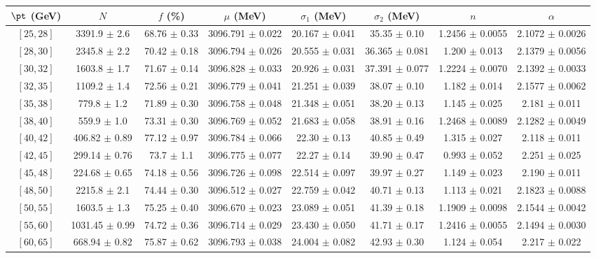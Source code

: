\begin{tabular}{c||c|c|c|c|c|c|c}
$\pt$ (GeV) & $N$ & $f$ (\%) & $\mu$ (MeV) & $\sigma_1$ (MeV) & $\sigma_2$ (MeV) & $n$ & $\alpha$ \\
\hline
$[25, 28]$ & 3391.9 $\pm$ 2.6 & 68.76 $\pm$ 0.33 & 3096.791 $\pm$ 0.022 & 20.167 $\pm$ 0.041 & 35.35 $\pm$ 0.10 & 1.2456 $\pm$ 0.0055 & 2.1072 $\pm$ 0.0026\\
$[28, 30]$ & 2345.8 $\pm$ 2.2 & 70.42 $\pm$ 0.18 & 3096.794 $\pm$ 0.026 & 20.555 $\pm$ 0.031 & 36.365 $\pm$ 0.081 & 1.200 $\pm$ 0.013 & 2.1379 $\pm$ 0.0056\\
$[30, 32]$ & 1603.8 $\pm$ 1.7 & 71.67 $\pm$ 0.14 & 3096.828 $\pm$ 0.033 & 20.926 $\pm$ 0.031 & 37.391 $\pm$ 0.077 & 1.2224 $\pm$ 0.0070 & 2.1392 $\pm$ 0.0033\\
$[32, 35]$ & 1109.2 $\pm$ 1.4 & 72.56 $\pm$ 0.21 & 3096.779 $\pm$ 0.041 & 21.251 $\pm$ 0.039 & 38.07 $\pm$ 0.10 & 1.182 $\pm$ 0.014 & 2.1577 $\pm$ 0.0062\\
$[35, 38]$ & 779.8 $\pm$ 1.2 & 71.89 $\pm$ 0.30 & 3096.758 $\pm$ 0.048 & 21.348 $\pm$ 0.051 & 38.20 $\pm$ 0.13 & 1.145 $\pm$ 0.025 & 2.181 $\pm$ 0.011\\
$[38, 40]$ & 559.9 $\pm$ 1.0 & 73.31 $\pm$ 0.30 & 3096.769 $\pm$ 0.052 & 21.683 $\pm$ 0.058 & 38.91 $\pm$ 0.16 & 1.2468 $\pm$ 0.0089 & 2.1282 $\pm$ 0.0049\\
$[40, 42]$ & 406.82 $\pm$ 0.89 & 77.12 $\pm$ 0.97 & 3096.784 $\pm$ 0.066 & 22.30 $\pm$ 0.13 & 40.85 $\pm$ 0.49 & 1.315 $\pm$ 0.027 & 2.118 $\pm$ 0.011\\
$[42, 45]$ & 299.14 $\pm$ 0.76 & 73.7 $\pm$ 1.1 & 3096.775 $\pm$ 0.077 & 22.27 $\pm$ 0.14 & 39.90 $\pm$ 0.47 & 0.993 $\pm$ 0.052 & 2.251 $\pm$ 0.025\\
$[45, 48]$ & 224.68 $\pm$ 0.65 & 74.18 $\pm$ 0.56 & 3096.726 $\pm$ 0.098 & 22.514 $\pm$ 0.097 & 39.97 $\pm$ 0.27 & 1.149 $\pm$ 0.023 & 2.190 $\pm$ 0.011\\
$[48, 50]$ & 2215.8 $\pm$ 2.1 & 74.44 $\pm$ 0.30 & 3096.512 $\pm$ 0.027 & 22.759 $\pm$ 0.042 & 40.71 $\pm$ 0.13 & 1.113 $\pm$ 0.021 & 2.1823 $\pm$ 0.0088\\
$[50, 55]$ & 1603.5 $\pm$ 1.3 & 75.25 $\pm$ 0.40 & 3096.670 $\pm$ 0.023 & 23.089 $\pm$ 0.051 & 41.39 $\pm$ 0.18 & 1.1909 $\pm$ 0.0098 & 2.1544 $\pm$ 0.0042\\
$[55, 60]$ & 1031.45 $\pm$ 0.99 & 74.72 $\pm$ 0.36 & 3096.714 $\pm$ 0.029 & 23.430 $\pm$ 0.050 & 41.71 $\pm$ 0.17 & 1.2416 $\pm$ 0.0055 & 2.1494 $\pm$ 0.0030\\
$[60, 65]$ & 668.94 $\pm$ 0.82 & 75.87 $\pm$ 0.62 & 3096.793 $\pm$ 0.038 & 24.004 $\pm$ 0.082 & 42.93 $\pm$ 0.30 & 1.124 $\pm$ 0.054 & 2.217 $\pm$ 0.022\\

\end{tabular}
